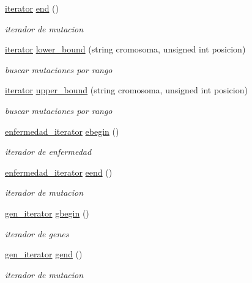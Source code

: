 \begin{DoxyCompactItemize}
\hyperlink{classclinvar_1_1iterator}{iterator} \hyperlink{classclinvar_a1a0c0fbf0e1dca56d6484542fe65ba0b}{end} ()
\begin{DoxyCompactList}\small\item\em iterador de mutacion \end{DoxyCompactList}\item 
\hyperlink{classclinvar_1_1iterator}{iterator} \hyperlink{classclinvar_adfc0e9da83925510242d5b20eb8be134}{lower\+\_\+bound} (string cromosoma, unsigned int posicion)
\begin{DoxyCompactList}\small\item\em buscar mutaciones por rango \end{DoxyCompactList}\item 
\hyperlink{classclinvar_1_1iterator}{iterator} \hyperlink{classclinvar_afd45e54ec82f01a5c0d39e95811a3574}{upper\+\_\+bound} (string cromosoma, unsigned int posicion)
\begin{DoxyCompactList}\small\item\em buscar mutaciones por rango \end{DoxyCompactList}\item 
\hyperlink{classclinvar_a4e04baa8b244566f2c25347c18f036b0}{enfermedad\+\_\+iterator} \hyperlink{classclinvar_aa41a88872af0b7acf1daaef72b1124e6}{ebegin} ()
\begin{DoxyCompactList}\small\item\em iterador de enfermedad \end{DoxyCompactList}\item 
\hyperlink{classclinvar_a4e04baa8b244566f2c25347c18f036b0}{enfermedad\+\_\+iterator} \hyperlink{classclinvar_af33a34f9e66faaf7769b66eef3062bcc}{eend} ()
\begin{DoxyCompactList}\small\item\em iterador de mutacion \end{DoxyCompactList}\item 
\hyperlink{classclinvar_1_1gen__iterator}{gen\+\_\+iterator} \hyperlink{classclinvar_a907aef6317168636a02c9502b3fac710}{gbegin} ()
\begin{DoxyCompactList}\small\item\em iterador de genes \end{DoxyCompactList}\item 
\hyperlink{classclinvar_1_1gen__iterator}{gen\+\_\+iterator} \hyperlink{classclinvar_ac2cf0bce7627b4bc3b4beae7718f2848}{gend} ()
\begin{DoxyCompactList}\small\item\em iterador de mutacion \end{DoxyCompactList}\end{DoxyCompactItemize}

